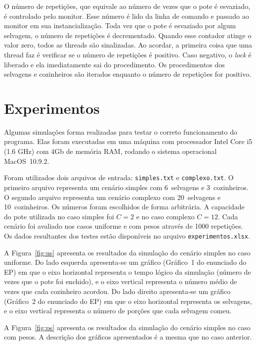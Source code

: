 \documentclass[11pt,a4paper]{article}
\begin{document}
O número de repetições, que equivale ao número de vezes que o pote é esvaziado, é controlado
pelo monitor. Esse número é lido da linha de comando e passado ao monitor em sua instancialização.
Toda vez que o pote é esvaziado por algum selvagem, o número de repetições é decrementado. Quando
esse contador atinge o valor zero, todos as threads são sinalizadas. Ao acordar, a primeira coisa
que uma thread faz é verificar se o número de repetições é positivo. Caso negativo, o {\it lock} é
liberado e ela imediatamente sai do procedimento. Os procedimentos dos selvagens e cozinheiros são
iterados enquanto o número de repetições for positivo.


\section{Experimentos}
\label{sec:exp}

Algumas simulações forma realizadas para testar o correto funcionamento do programa. Elas foram 
executadas em uma máquina com processador Intel Core i5 (1.6 GHz) com 4Gb de memória RAM, rodando o 
sistema operacional MacOS~10.9.2.

Foram utilizados dois arquivos de entrada: \verb|simples.txt| e \verb|complexo.txt|. O primeiro 
arquivo representa um cenário simples com 6~selvagens e 3~cozinheiros. O segundo arquivo representa 
um cenário complexo com 20~selvagens e 10~cozinheiros. Os números foram escolhidos de forma 
arbitrária. A capacidade do pote utilizada no caso simples foi $C = 2$ e no caso complexo $C = 12$. 
Cada cenário foi avaliado nos casos uniforme e com pesos através de 1000 repetições. Os dados 
resultantes dos testes estão disponíveis no arquivo \verb|experimentos.xlsx|.

A Figura~\ref{fig:us} apresenta os resultados da simulação do cenário simples no caso uniforme. Do
lado esquerda apresenta-se um gráfico (Gráfico~1 do enunciado do EP) em que o eixo horizontal
representa o tempo lógico da simulação (número de vezes que o pote foi enchido), e o eixo vertical
representa o  número médio de vezes que cada cozinheiro acordou. Do lado direito apresenta-se um
gráfico (Gráfico~2 do enunciado do EP) em que o eixo horizontal representa os selvagens, e o eixo
vertical representa o número de porções que cada selvagem comeu.

A Figura~\ref{fig:ps} apresenta os resultados da simulação do cenário simples no caso com pesos. A 
descrição dos gráficos apresentados é a mesma que no caso anterior.
\end{document}
